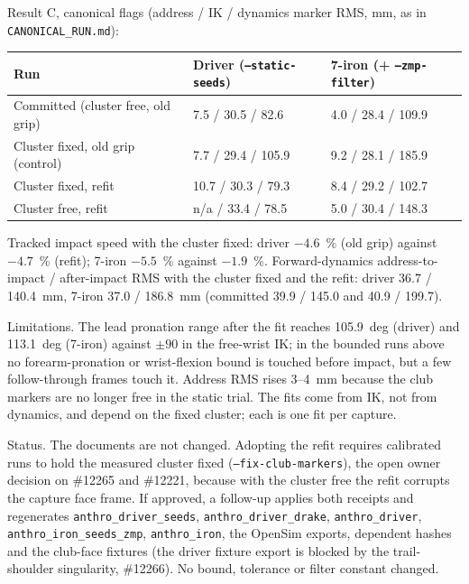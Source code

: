 \documentclass[11pt,a4paper]{article}
\begin{document}
Result C, canonical flags (address / IK / dynamics marker RMS, mm, as in
\texttt{CANONICAL\_RUN.md}):

\begin{center}
\begin{tabular}{lll}
\hline
Run & Driver (\texttt{--static-seeds}) & 7-iron (+ \texttt{--zmp-filter}) \\
\hline
Committed (cluster free, old grip) & 7.5 / 30.5 / 82.6 & 4.0 / 28.4 / 109.9 \\
Cluster fixed, old grip (control) & 7.7 / 29.4 / 105.9 & 9.2 / 28.1 / 185.9 \\
Cluster fixed, refit & 10.7 / 30.3 / 79.3 & 8.4 / 29.2 / 102.7 \\
Cluster free, refit & n/a / 33.4 / 78.5 & 5.0 / 30.4 / 148.3 \\
\hline
\end{tabular}
\end{center}
Tracked impact speed with the cluster fixed: driver $-4.6$~\% (old grip) against
$-4.7$~\% (refit); 7-iron $-5.5$~\% against $-1.9$~\%. Forward-dynamics
address-to-impact / after-impact RMS with the cluster fixed and the refit: driver
36.7 / 140.4~mm, 7-iron 37.0 / 186.8~mm (committed 39.9 / 145.0 and 40.9 / 199.7).

Limitations. The lead pronation range after the fit reaches 105.9~deg (driver) and
113.1~deg (7-iron) against $\pm 90$ in the free-wrist IK; in the bounded runs above
no forearm-pronation or wrist-flexion bound is touched before impact, but a few
follow-through frames touch it. Address RMS rises 3--4~mm because the club markers
are no longer free in the static trial. The fits come from IK, not from dynamics,
and depend on the fixed cluster; each is one fit per capture.

Status. The documents are not changed. Adopting the refit requires calibrated runs
to hold the measured cluster fixed (\texttt{--fix-club-markers}), the open owner
decision on \#12265 and \#12221, because with the cluster free the refit corrupts
the capture face frame. If approved, a follow-up applies both receipts and
regenerates \texttt{anthro\_driver\_seeds}, \texttt{anthro\_driver\_drake},
\texttt{anthro\_driver}, \texttt{anthro\_iron\_seeds\_zmp}, \texttt{anthro\_iron},
the OpenSim exports, dependent hashes and the club-face fixtures (the driver
fixture export is blocked by the trail-shoulder singularity, \#12266). No bound,
tolerance or filter constant changed.
\end{document}
